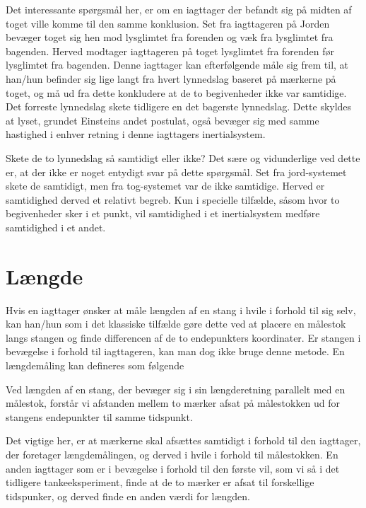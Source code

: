 Det interessante spørgsmål her, er om en iagttager der befandt sig på midten af toget ville komme til den samme konklusion. Set fra iagttageren på Jorden bevæger toget sig hen mod lysglimtet fra forenden og væk fra lysglimtet fra bagenden. Herved modtager iagttageren på toget lysglimtet fra forenden før lysglimtet fra bagenden. Denne iagttager kan efterfølgende måle sig frem til, at han/hun befinder sig lige langt fra hvert lynnedslag baseret på mærkerne på toget, og må ud fra dette konkludere at de to begivenheder ikke var samtidige. Det forreste lynnedslag skete tidligere en det bagerste lynnedslag. Dette skyldes at lyset, grundet Einsteins andet postulat, også bevæger sig med samme hastighed i enhver retning i denne iagttagers inertialsystem.

Skete de to lynnedslag så samtidigt eller ikke? Det sære og vidunderlige ved dette er, at der ikke er noget entydigt svar på dette spørgsmål. Set fra jord-systemet skete de samtidigt, men fra tog-systemet var de ikke samtidige. Herved er samtidighed derved et relativt begreb. Kun i specielle tilfælde, såsom hvor to begivenheder sker i et punkt, vil samtidighed i et inertialsystem medføre samtidighed i et andet.

\section{Længde}


Hvis en iagttager ønsker at måle længden af en stang i hvile i forhold til sig selv, kan han/hun som i det klassiske tilfælde gøre dette ved at placere en målestok langs stangen og finde differencen af de to endepunkters koordinater. Er stangen i bevægelse i forhold til iagttageren, kan man dog ikke bruge denne metode. En længdemåling kan defineres som følgende

\begin{framed}
	\centering
	Ved længden af en stang, der bevæger sig i sin længderetning parallelt med en målestok, forstår vi afstanden mellem to mærker afsat på målestokken ud for stangens endepunkter til samme tidspunkt.
\end{framed}

Det vigtige her, er at mærkerne skal afsættes samtidigt i forhold til den iagttager, der foretager længdemålingen, og derved i hvile i forhold til målestokken. En anden iagttager som er i bevægelse i forhold til den første vil, som vi så i det tidligere tankeeksperiment, finde at de to mærker er afsat til forskellige tidspunker, og derved finde en anden værdi for længden.

